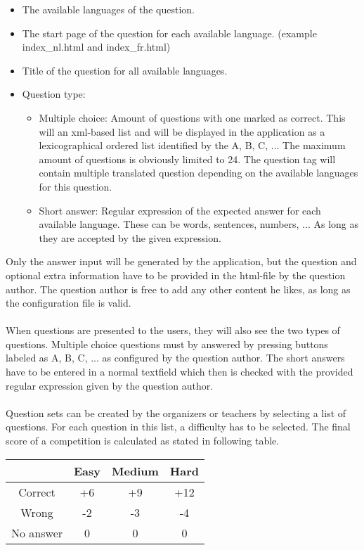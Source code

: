 	\begin{itemize}
		\item The available languages of the question.
		\item The start page of the question for each available language.
		(example index\_nl.html and index\_fr.html)
  		\item Title of the question for all available languages.
  		\item Question type:
  		\begin{itemize}
  			\item Multiple choice: Amount of questions with one marked as correct.
  			This will an xml-based list and will be displayed in the application as a
  			lexicographical ordered list identified by the A, B, C, ...
  			The maximum amount of questions is obviously limited to 24.
  			The question tag will contain multiple translated question depending on the
  			available languages for this question.
  			\item Short answer: Regular expression of the expected answer for each
  			available language. These can be words, sentences, numbers, ... As long as
  			they are accepted by the given expression.
  		\end{itemize}
	\end{itemize}
	Only the answer input will be generated by the application, but the question and
	optional extra information have to be provided in the html-file by the question author.
	The question author is free to add any other content he likes, as long as the
	configuration file is valid. \\
	\\
	When questions are presented to the users, they will also see the two types of
	questions. Multiple choice questions must by answered by pressing buttons labeled as
	A, B, C, ... as configured by the question author. The short answers have to be
	entered in a normal textfield which then is checked with the provided regular
	expression given by the question author.\\
	\\
	Question sets can be created by the organizers or teachers by selecting a list of questions.
	For each question in this list, a difficulty has to be selected. The final score of a
	competition is calculated as stated in following table.\\
	\begin{tabular}{| c| c| c| c| }
	\hline
	  & Easy & Medium & Hard \\
	\hline
	  Correct & +6 & +9 & +12 \\
	\hline
	  Wrong & -2 & -3 & -4 \\
	\hline
	  No answer & 0 & 0 & 0 \\
	\hline
	\end{tabular}\\ \\
